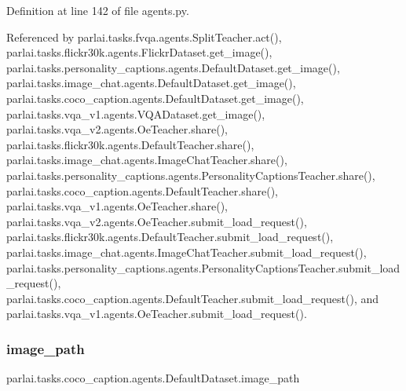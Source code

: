 Definition at line 142 of file agents.\+py.



Referenced by parlai.\+tasks.\+fvqa.\+agents.\+Split\+Teacher.\+act(), parlai.\+tasks.\+flickr30k.\+agents.\+Flickr\+Dataset.\+get\+\_\+image(), parlai.\+tasks.\+personality\+\_\+captions.\+agents.\+Default\+Dataset.\+get\+\_\+image(), parlai.\+tasks.\+image\+\_\+chat.\+agents.\+Default\+Dataset.\+get\+\_\+image(), parlai.\+tasks.\+coco\+\_\+caption.\+agents.\+Default\+Dataset.\+get\+\_\+image(), parlai.\+tasks.\+vqa\+\_\+v1.\+agents.\+V\+Q\+A\+Dataset.\+get\+\_\+image(), parlai.\+tasks.\+vqa\+\_\+v2.\+agents.\+Oe\+Teacher.\+share(), parlai.\+tasks.\+flickr30k.\+agents.\+Default\+Teacher.\+share(), parlai.\+tasks.\+image\+\_\+chat.\+agents.\+Image\+Chat\+Teacher.\+share(), parlai.\+tasks.\+personality\+\_\+captions.\+agents.\+Personality\+Captions\+Teacher.\+share(), parlai.\+tasks.\+coco\+\_\+caption.\+agents.\+Default\+Teacher.\+share(), parlai.\+tasks.\+vqa\+\_\+v1.\+agents.\+Oe\+Teacher.\+share(), parlai.\+tasks.\+vqa\+\_\+v2.\+agents.\+Oe\+Teacher.\+submit\+\_\+load\+\_\+request(), parlai.\+tasks.\+flickr30k.\+agents.\+Default\+Teacher.\+submit\+\_\+load\+\_\+request(), parlai.\+tasks.\+image\+\_\+chat.\+agents.\+Image\+Chat\+Teacher.\+submit\+\_\+load\+\_\+request(), parlai.\+tasks.\+personality\+\_\+captions.\+agents.\+Personality\+Captions\+Teacher.\+submit\+\_\+load\+\_\+request(), parlai.\+tasks.\+coco\+\_\+caption.\+agents.\+Default\+Teacher.\+submit\+\_\+load\+\_\+request(), and parlai.\+tasks.\+vqa\+\_\+v1.\+agents.\+Oe\+Teacher.\+submit\+\_\+load\+\_\+request().

\mbox{\label{classparlai_1_1tasks_1_1coco__caption_1_1agents_1_1DefaultDataset_a6d14a4869069e29159a5f315efac0207}} 
\subsubsection{\texorpdfstring{image\+\_\+path}{image\_path}}
{\footnotesize\ttfamily parlai.\+tasks.\+coco\+\_\+caption.\+agents.\+Default\+Dataset.\+image\+\_\+path}



